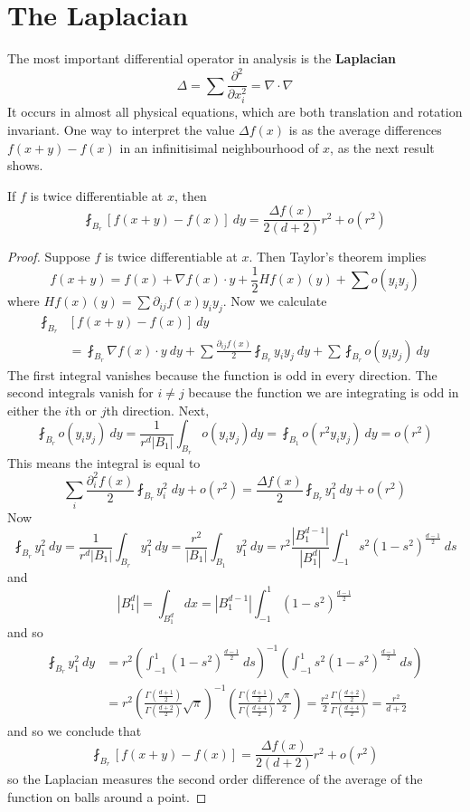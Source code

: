 \section{The Laplacian}

The most important differential operator in analysis is the {\bf Laplacian}
%
\[ \Delta = \sum \frac{\partial^2}{\partial x_i^2} = \nabla \cdot \nabla \]
%
It occurs in almost all physical equations, which are both translation and rotation invariant. One way to interpret the value $\Delta f(x)$ is as the average differences $f(x+y) - f(x)$ in an infinitisimal neighbourhood of $x$, as the next result shows.

\begin{theorem}
    If $f$ is twice differentiable at $x$, then
    \[ \fint_{B_r} [f(x+y) - f(x)]\ dy = \frac{\Delta f(x)}{2(d+2)} r^2 + o(r^2) \]
\end{theorem}
\begin{proof}
    Suppose $f$ is twice differentiable at $x$. Then Taylor's theorem implies
    \[ f(x + y) = f(x) + \nabla f(x) \cdot y + \frac{1}{2} Hf(x)(y) + \sum o(y_iy_j) \]
    where $Hf(x)(y) = \sum \partial_{ij} f(x) y_iy_j$. Now we calculate
    \begin{align*}
        \fint_{B_r} &[f(x + y) - f(x)]\ dy\\
        &= \fint_{B_r} \nabla f(x) \cdot y\ dy + \sum \frac{\partial_{ij} f(x)}{2} \fint_{B_r} y_iy_j\ dy + \sum \fint_{B_r} o(y_iy_j)\ dy
    \end{align*}
    The first integral vanishes because the function is odd in every direction. The second integrals vanish for $i \neq j$ because the function we are integrating is odd in either the $i$th or $j$th direction. Next,
    \[ \fint_{B_r} o(y_iy_j)\ dy = \frac{1}{r^d |B_1|} \int_{B_r} o(y_iy_j) dy = \fint_{B_1} o(r^2 y_iy_j)\ dy = o(r^2) \]
    This means the integral is equal to
    \[ \sum_i \frac{\partial_i^2 f(x)}{2} \fint_{B_r} y_i^2\; dy + o(r^2) = \frac{\Delta f(x)}{2} \fint_{B_r} y_1^2\ dy + o(r^2) \]
    Now
    \[ \fint_{B_r} y_1^2\ dy = \frac{1}{r^d |B_1|} \int_{B_r} y_1^2\ dy = \frac{r^2}{|B_1|} \int_{B_1} y_1^2\ dy = r^2 \frac{|B_1^{d-1}|}{|B_1^d|} \int_{-1}^1 s^2 (1 - s^2)^{\frac{d-1}{2}}\ ds \]
    and
    \[ |B_1^d| = \int_{B_1^d} dx = |B_1^{d-1}| \int_{-1}^1 (1 - s^2)^{\frac{d-1}{2}} \]
    and so
    \begin{align*}
        \fint_{B_r} y_1^2\ dy &= r^2 \left( \int_{-1}^1 (1 - s^2)^{\frac{d-1}{2}}\ ds \right)^{-1} \left( \int_{-1}^1 s^2 (1 - s^2)^{\frac{d-1}{2}}\ ds \right)\\
        &= r^2 \left( \frac{\Gamma( \frac{d+1}{2} )}{\Gamma ( \frac{d + 2}{2} )} \sqrt{\pi} \right)^{-1} \left( \frac{\Gamma( \frac{d+1}{2} )}{\Gamma( \frac{d + 4}{2} )} \frac{\sqrt{\pi}}{2} \right) = \frac{r^2}{2} \frac{\Gamma( \frac{d+2}{2})}{\Gamma( \frac{d+4}{2} )} = \frac{r^2}{d + 2}
    \end{align*}
    and so we conclude that
    \[ \fint_{B_r} [f(x+y) - f(x)] = \frac{\Delta f(x)}{2(d+2)} r^2 + o(r^2) \]
    so the Laplacian measures the second order difference of the average of the function on balls around a point.
\end{proof}

